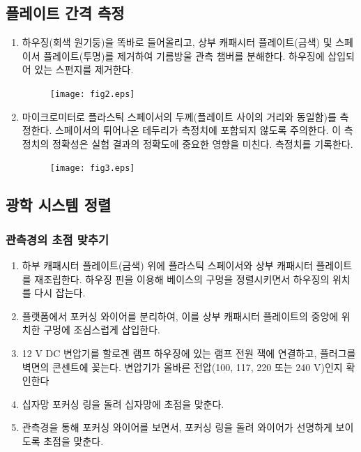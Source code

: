 \documentclass[a4paper, 10pt, nanum]{CSUniSchoolLabReport}
\begin{document}
\subsection{플레이트 간격 측정}

\begin{enumerate}[label=\arabic*.]
	\item 하우징(회색 원기둥)을 똑바로 들어올리고, 상부 캐패시터 플레이트(금색) 및 스페이서 플레이트(투명)를 제거하여 기름방울 관측 챔버를 분해한다. 하우징에 삽입되어 있는 스펀지를 제거한다.

	\begin{figure}[htb!]
		\centering
		\texttt{[image: fig2.eps]}
		\caption{}
		\label{fig:2}
	\end{figure}

	\item 마이크로미터로 플라스틱 스페이서의 두께(플레이트 사이의 거리와 동일함)를 측정한다. 스페이서의 튀어나온 테두리가 측정치에 포함되지 않도록 주의한다. 이 측정치의 	정확성은 실험 결과의 정확도에 중요한 영향을 미친다. 측정치를 기록한다.

	\begin{figure}[htb!]
		\centering
		\texttt{[image: fig3.eps]}
		\caption{}
		\label{fig:3}
	\end{figure}

\end{enumerate}

\subsection{광학 시스템 정렬}

\subsubsection{관측경의 초점 맞추기}

\begin{enumerate}[label=\arabic*.]
	\item 하부 캐패시터 플레이트(금색) 위에 플라스틱 스페이서와 상부 캐패시터 플레이트를 재조립한다. 하우징 핀을 이용해 베이스의 구멍을 정렬시키면서 하우징의 위치를 다시 잡는다.
	\item 플랫폼에서 포커싱 와이어를 분리하여, 이를 상부 캐패시터 플레이트의 중앙에 위치한 구멍에 조심스럽게 삽입한다.
	\item 12 V DC 변압기를 할로겐 램프 하우징에 있는 램프 전원 잭에 연결하고, 플러그를 벽면의 콘센트에 꽂는다. 변압기가 올바른 전압(100, 117, 220 또는 240 V)인지 확인한다
	\item 십자망 포커싱 링을 돌려 십자망에 초점을 맞춘다.
	\item 관측경을 통해 포커싱 와이어를 보면서, 포커싱 링을 돌려 와이어가 선명하게 보이도록 초점을 맞춘다.
\end{enumerate}
\end{document}
